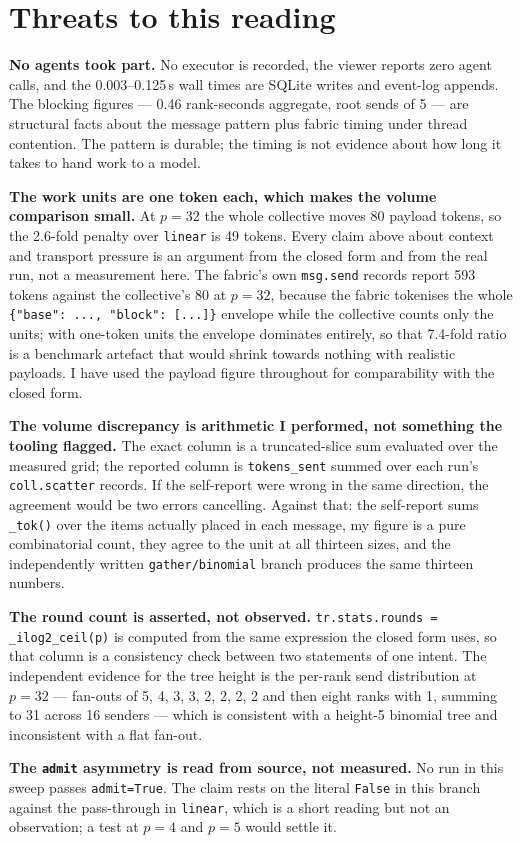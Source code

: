 \documentclass[11pt]{article}
\begin{document}
\section{Threats to this reading}

\textbf{No agents took part.} No executor is recorded, the viewer reports zero agent calls, and
the 0.003--0.125\,s wall times are SQLite writes and event-log appends. The blocking figures ---
0.46 rank-seconds aggregate, root sends of 5 --- are structural facts about the message pattern
plus fabric timing under thread contention. The pattern is durable; the timing is not evidence
about how long it takes to hand work to a model.

\textbf{The work units are one token each, which makes the volume comparison small.} At $p=32$ the
whole collective moves 80 payload tokens, so the 2.6-fold penalty over \texttt{linear} is 49
tokens. Every claim above about context and transport pressure is an argument from the closed form
and from the real run, not a measurement here. The fabric's own \texttt{msg.send} records report
593 tokens against the collective's 80 at $p=32$, because the fabric tokenises the whole
\verb|{"base": ..., "block": [...]}| envelope while the collective counts only the units; with
one-token units the envelope dominates entirely, so that 7.4-fold ratio is a benchmark artefact
that would shrink towards nothing with realistic payloads. I have used the payload figure
throughout for comparability with the closed form.

\textbf{The volume discrepancy is arithmetic I performed, not something the tooling flagged.} The
exact column is a truncated-slice sum evaluated over the measured grid; the reported column is
\texttt{tokens\_sent} summed over each run's \texttt{coll.scatter} records. If the self-report were
wrong in the same direction, the agreement would be two errors cancelling. Against that: the
self-report sums \texttt{\_tok()} over the items actually placed in each message, my figure is a
pure combinatorial count, they agree to the unit at all thirteen sizes, and the independently
written \texttt{gather/binomial} branch produces the same thirteen numbers.

\textbf{The round count is asserted, not observed.} \texttt{tr.stats.rounds =
\_ilog2\_ceil(p)} is computed from the same expression the closed form uses, so that column is a
consistency check between two statements of one intent. The independent evidence for the tree
height is the per-rank send distribution at $p=32$ --- fan-outs of 5, 4, 3, 3, 2, 2, 2, 2 and then
eight ranks with 1, summing to 31 across 16 senders --- which is consistent with a height-5
binomial tree and inconsistent with a flat fan-out.

\textbf{The \texttt{admit} asymmetry is read from source, not measured.} No run in this sweep
passes \texttt{admit=True}. The claim rests on the literal \texttt{False} in this branch against
the pass-through in \texttt{linear}, which is a short reading but not an observation; a test at
$p=4$ and $p=5$ would settle it.
\end{document}
